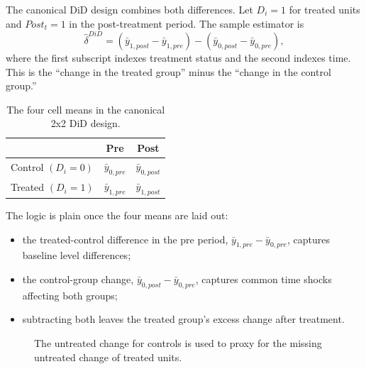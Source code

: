 \hypertarget{main:did-2x2}{}
The canonical \ac{DiD} design combines both differences. Let $D_i=1$ for treated units and $Post_t=1$ in the post-treatment period. The sample estimator is
\begin{equation}
\hat{\delta}^{DiD}
=
(\bar{y}_{1,post}-\bar{y}_{1,pre})-(\bar{y}_{0,post}-\bar{y}_{0,pre}),
\label{eq:did_algebra}
\end{equation}
where the first subscript indexes treatment status and the second indexes time. This is the ``change in the treated group'' minus the ``change in the control group.''

\begin{table}[h]
\centering
\begin{tabular}{lcc}
\toprule
& Pre & Post \\
\midrule
Control $(D_i=0)$ & $\bar{y}_{0,pre}$ & $\bar{y}_{0,post}$ \\
Treated $(D_i=1)$ & $\bar{y}_{1,pre}$ & $\bar{y}_{1,post}$ \\
\bottomrule
\end{tabular}
\caption{The four cell means in the canonical 2x2 \ac{DiD} design.}
\label{tab:did_2x2_means}
\end{table}

The logic is plain once the four means are laid out:
\begin{itemize}
\item the treated-control difference in the pre period, $\bar{y}_{1,pre}-\bar{y}_{0,pre}$, captures baseline level differences;
\item the control-group change, $\bar{y}_{0,post}-\bar{y}_{0,pre}$, captures common time shocks affecting both groups;
\item subtracting both leaves the treated group's excess change after treatment.
\end{itemize}

\begin{figure}[h]
\centering
{}
\caption{The untreated change for controls is used to proxy for the missing untreated change of treated units.}
\label{fig:did_paths}
\end{figure}

